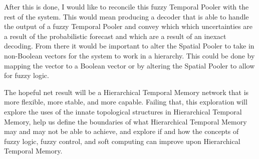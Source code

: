 \documentclass[fleqn,minimal]{article}
\newcommand\blankpage{
	\pagebreak
	\ifthispageodd{\null
		\vfill
		\vfill
		\thispagestyle{empty}
		\clearpage}{}
}
\begin{document}
	After this is done, I would like to reconcile this fuzzy Temporal Pooler with the rest of the system. This would mean producing a decoder that is able to handle the output of a fuzzy Temporal Pooler and convey which which uncertainties are a result of the probabilistic forecast and which are a result of an inexact decoding. From there it would be important to alter the Spatial Pooler to take in non-Boolean vectors for the system to work in a hierarchy. This could be done by mapping the vector to a Boolean vector or by altering the Spatial Pooler to allow for fuzzy logic.
	
	The hopeful net result will be a Hierarchical Temporal Memory network that is more flexible, more stable, and more capable. Failing that, this exploration will explore the uses of the innate topological structures in Hierarchical Temporal Memory, help us define the boundaries of what Hierarchical Temporal Memory may and may not be able to achieve, and explore if and how the concepts of fuzzy logic, fuzzy control, and soft computing can improve upon Hierarchical Temporal Memory.
	
	\blankpage
	
	\nocite{*}  %
	{}
	
\end{document}
